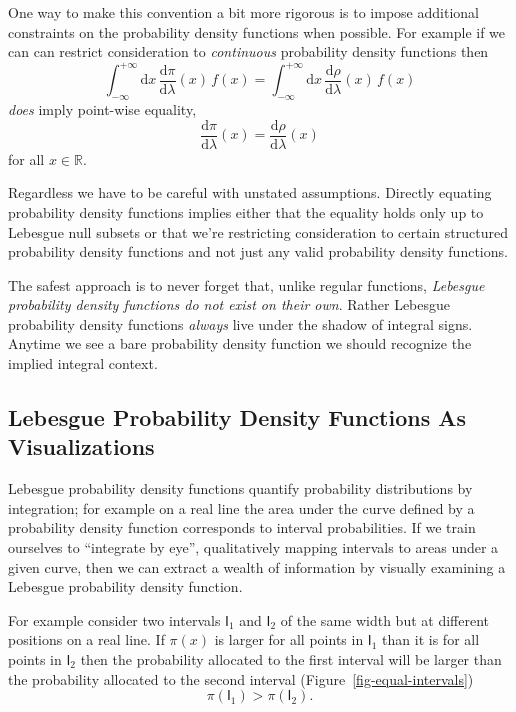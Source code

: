 \documentclass[
  letterpaper,
  DIV=11,
  numbers=noendperiod]{scrartcl}
\begin{document}
One way to make this convention a bit more rigorous is to impose
additional constraints on the probability density functions when
possible. For example if we can can restrict consideration to
\emph{continuous} probability density functions then \[
\int_{-\infty}^{+\infty} \mathrm{d} x \,
\frac{ \mathrm{d} \pi }{ \mathrm{d} \lambda}(x)
\, f(x)
=
\int_{-\infty}^{+\infty} \mathrm{d} x \,
\frac{ \mathrm{d} \rho }{ \mathrm{d} \lambda}(x)
\, f(x)
\] \emph{does} imply point-wise equality, \[
\frac{ \mathrm{d} \pi }{ \mathrm{d} \lambda}(x)
=
\frac{ \mathrm{d} \rho }{ \mathrm{d} \lambda}(x)
\] for all \(x \in \mathbb{R}\).

Regardless we have to be careful with unstated assumptions. Directly
equating probability density functions implies either that the equality
holds only up to Lebesgue null subsets or that we're restricting
consideration to certain structured probability density functions and
not just any valid probability density functions.

The safest approach is to never forget that, unlike regular functions,
\emph{Lebesgue probability density functions do not exist on their own}.
Rather Lebesgue probability density functions \emph{always} live under
the shadow of integral signs. Anytime we see a bare probability density
function we should recognize the implied integral context.

\hypertarget{sec:visualizing}{%
\subsection{Lebesgue Probability Density Functions As
Visualizations}\label{sec:visualizing}}

Lebesgue probability density functions quantify probability
distributions by integration; for example on a real line the area under
the curve defined by a probability density function corresponds to
interval probabilities. If we train ourselves to ``integrate by eye'',
qualitatively mapping intervals to areas under a given curve, then we
can extract a wealth of information by visually examining a Lebesgue
probability density function.

For example consider two intervals \(\mathsf{I}_{1}\) and
\(\mathsf{I}_{2}\) of the same width but at different positions on a
real line. If \(\pi(x)\) is larger for all points in \(\mathsf{I}_{1}\)
than it is for all points in \(\mathsf{I}_{2}\) then the probability
allocated to the first interval will be larger than the probability
allocated to the second interval (Figure~\ref{fig-equal-intervals}) \[
\pi(\mathsf{I}_{1}) > \pi(\mathsf{I}_{2}).
\]
\end{document}
